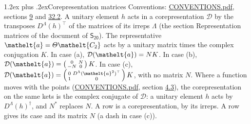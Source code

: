 \documentclass[10pt,a4paper]{article}
\makeatletter
\renewcommand\section{\@startsection{section}{1}{\z@}{-3ex plus -1ex minus -.2ex}%
  {1.2ex plus .2ex}{\normalfont\large\sffamily\bfseries\color{parttitle}}}
\numberwithin{equation}{section}
\newcommand{\eltfont}[1]{{\let\sigma\eltsigma\mathelt{#1}}}
\newcommand{\grp}[1]{\mathsf{#1}}
\newcommand{\elt}[1]{\eltfont{#1}}
\makeatother
\begin{document}
\section{Corepresentation matrices}\label{s:corep_matrices}
Conventions: \href{../../CONVENTIONS.pdf}{CONVENTIONS.pdf}, sections \href{../../../rotation/CONVENTIONS.pdf\#conv.9}{9} and \href{../../CONVENTIONS.pdf\#conv.32.2}{32.2}.
A unitary element $h$ acts in a corepresentation $\mathcal{D}$ by the transposes $D^{\Lambda}(h)^{\top}$ of the matrices of its irreps $\Lambda$ (the section Representation matrices of the document of \href{../../../rotation/data/pdf/S20.pdf}{$\grp{S_{20}}$}). The representative $\elt{a} = \varTheta\elt{C_{2}}$ acts by a unitary matrix times the complex conjugation $K$.
In case (a), $\mathcal{D}(\elt{a}) = NK$. In case (b), $\mathcal{D}(\elt{a}) = \left(\begin{smallmatrix} 0 & N \\ -N & 0 \end{smallmatrix}\right) K$. In case (c), $\mathcal{D}(\elt{a}) = \left(\begin{smallmatrix} 0 & D^{\Lambda}(\elt{a}^2)^{\top} \\ 1 & 0 \end{smallmatrix}\right) K$, with no matrix $N$.
Where a function moves with the points (\href{../../CONVENTIONS.pdf}{CONVENTIONS.pdf}, section \href{../../../rotation/CONVENTIONS.pdf\#conv.4.3}{4.3}), the corepresentation on the same kets is the complex conjugate of $\mathcal{D}$: a unitary element $h$ acts by $D^{\Lambda}(h)^{\dagger}$, and $N^{*}$ replaces $N$.
A row is a corepresentation, by its irreps. A row gives its case and its matrix $N$ (a dash in case (c)).
\end{document}
